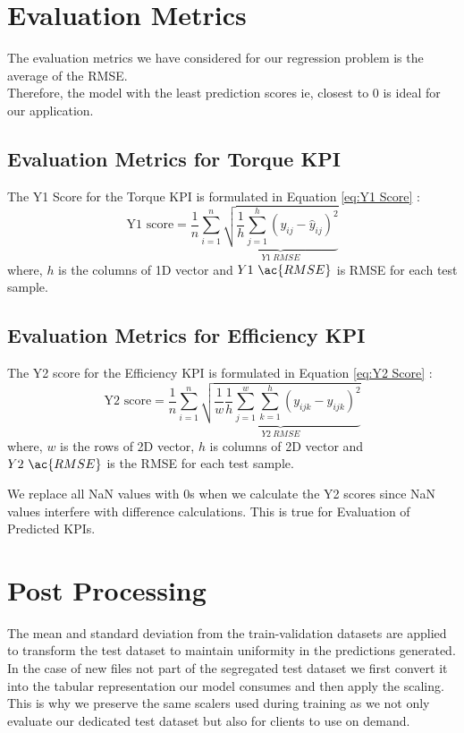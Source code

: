 \documentclass{report} %
\begin{document}
\section{Evaluation Metrics}
The evaluation metrics we have considered for our regression problem is the average of the \ac{RMSE}. \\
Therefore, the model with the least prediction scores ie, closest to 0 is ideal for our application. \\

\subsection{Evaluation Metrics for Torque \ac{KPI}}\label{sec:Evaluation Metrics for 2D KPI}
The Y1 Score for the Torque \ac{KPI} is formulated in Equation \ref{eq:Y1 Score} :
\begin{equation}
\text{Y1 score} = \frac{1}{n} \sum_{i=1}^{n} \underbrace{ \sqrt{\frac{1}{h} \sum_{j=1}^{h} (y_{ij} - \hat{y}_{ij})^2}}_{Y1\ RMSE}
\label{eq:Y1 Score}
\end{equation}
where, \(h\) is the columns of 1D vector and \(Y1\ \ac{RMSE}\) is \ac{RMSE} for each test sample.

\subsection{Evaluation Metrics for Efficiency \ac{KPI}}\label{sec:Evaluation Metrics for 3D KPI}
The Y2 score for the Efficiency \ac{KPI} is formulated in Equation \ref{eq:Y2 Score} :
\begin{equation}
    \text{Y2 score} = \frac{1}{n} \sum_{i=1}^{n} \underbrace{ \sqrt{\frac{1}{w} \frac{1}{h} \sum_{j=1}^{w} \sum_{k=1}^{h} (y_{ijk} - \hat{y}_{ijk})^2}}_{Y2\ RMSE}
    \label{eq:Y2 Score}
\end{equation}
where, \(w\) is the rows of 2\ac{D} vector, \(h\) is columns of 2\ac{D} vector and \(Y2\ \ac{RMSE}\) is the \ac{RMSE} for each test sample.

We replace all \ac{NaN} values with 0s when we calculate the Y2 scores since \ac{NaN} values interfere with difference calculations. This is true for Evaluation of Predicted \ac{KPI}s.

\section{Post Processing}\label{sec:Post Processing}
The mean and standard deviation from the train-validation datasets are applied to transform the test dataset to maintain uniformity in the predictions generated.
In the case of new files not part of the segregated test dataset we first convert it into the tabular representation our model consumes and then apply the scaling.\\
This is why we preserve the same scalers used during training as we not only evaluate our dedicated test dataset but also for clients to use on demand. 
\end{document}
